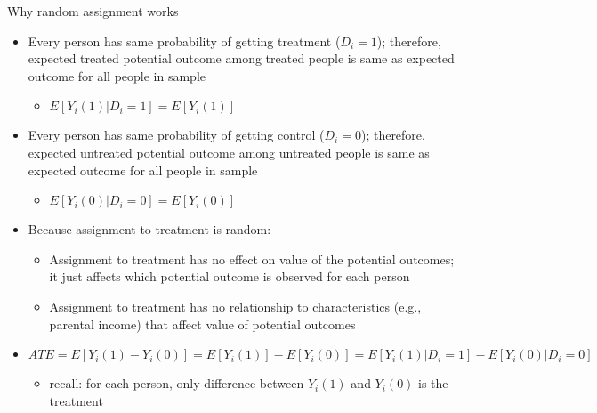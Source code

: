 \begin{frame}[shrink=10]{Why random assignment works}

	\begin{itemize}
		
		\item Every person has same probability of getting treatment ($D_i=1$); therefore, expected treated potential outcome among treated people is same as expected outcome for all people in sample
		\begin{itemize}
			\item $E[Y_i(1)|D_i=1]=E[Y_i(1)]$
		\end{itemize}
		\item Every person has same probability of getting control  ($D_i=0$); therefore, expected untreated potential outcome among untreated people is same as expected outcome for all people in sample
		\begin{itemize}
			\item $E[Y_i(0)|D_i=0]=E[Y_i(0)]$
		\end{itemize}
		\item Because assignment to treatment is random:
		\begin{itemize}
			\item Assignment to treatment has no effect on value of the potential outcomes; it just affects which potential outcome is observed for each person
			\item Assignment to treatment has no relationship to characteristics (e.g., parental income) that affect value of potential outcomes
		\end{itemize}		
		\item $ATE=E[Y_i(1)-Y_i(0)]=  E[Y_i(1)] - E[Y_i(0)] = E[Y_i(1)|D_i=1]-E[Y_i(0)|D_i=0]$
		\begin{itemize}
			\item recall: for each person, only difference between $ Y_i(1) $ and $Y_i(0)$ is the treatment
		\end{itemize}
	\end{itemize}
		
	
\end{frame}


